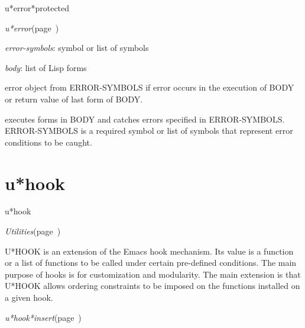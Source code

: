 \begin{description}
\item [Name:]  u*error*protected

\item [Class:]
{\sl u*error}\hfill(page~\pageref{u*error})

\item [Parameters:]
\item {\sl error-symbols}:  symbol or list of symbols

\item {\sl body}:  list of Lisp forms


\item [Return-value:] 
error object from ERROR-SYMBOLS if error occurs in the
execution of BODY or return value of last form of BODY.

\item [Description:]
executes forms in BODY and catches errors specified in
ERROR-SYMBOLS.  ERROR-SYMBOLS is a required symbol or
list of symbols that represent error conditions to be
caught.  

\item [Public:]



\end{description}
\horizontalline

\section{u*hook}
\label{u*hook}

\begin{description}
\item [Name:]  u*hook

\item [Layer:] {\sl Utilities}\hfill(page~\pageref{Utilities})

\item [Description:] 

U*HOOK is an extension of the Emacs hook mechanism. Its value
is a function or a list of functions to be called under certain
pre-defined conditions. The main purpose of hooks is for
customization and modularity. The main extension is that U*HOOK
allows ordering constraints to be imposed on the functions
installed on a given hook.

\item [Attributes:]

\item [Operations:]
\item {\sl u*hook*insert}\hfill(page~\pageref{u*hook*insert})

\item [Collections:]

\item [Subclasses:]

\item [Superclasses:]



\end{description}
\horizontalline

